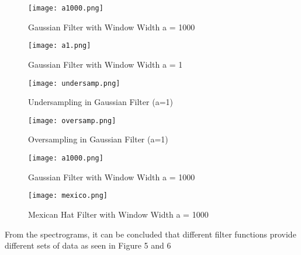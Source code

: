 \documentclass[a4paper,12pt]{article}
\begin{document}
\begin{figure}[!h]
	\centering
	\begin{minipage}[t]{3.5cm}
		\centering
		\texttt{[image: a1000.png]}
		\caption{Gaussian Filter with Window Width a = 1000}
	\end{minipage}
	\hspace{0.2cm}
	\begin{minipage}[t]{3cm}
		\centering
		\texttt{[image: a1.png]}
		\caption{Gaussian Filter with Window Width a = 1}
	\end{minipage}
	\begin{minipage}[t]{3cm}
		\centering
		\texttt{[image: undersamp.png]}
		\caption{Undersampling in Gaussian Filter (a=1)}
	\end{minipage}
	\hspace{0.2 cm}
	\begin{minipage}[t]{3cm}
		\centering
		\texttt{[image: oversamp.png]}
		\caption{Oversampling in Gaussian Filter (a=1)}
	\end{minipage}
	
\end{figure}
\begin{figure}[!h]
	\centering
	\begin{minipage}[t]{4cm}
		\centering
		\texttt{[image: a1000.png]}
		\caption{Gaussian Filter with Window Width a = 1000}
	\end{minipage}
	\hspace{2cm}
	\begin{minipage}[t]{4cm}
		\centering
		\texttt{[image: mexico.png]}
		\caption{Mexican Hat Filter with Window Width a = 1000}
	\end{minipage}

\end{figure}
From the spectrograms, it can be concluded that different filter functions provide different sets of data as seen in Figure 5 and 6
\end{document}
